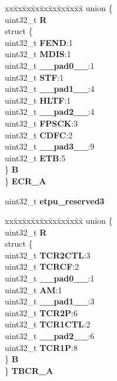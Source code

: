 \begin{DoxyCompactItemize}
\begin{tabbing}
\end{tabbing}\item 
\mbox{\label{structETPU__tag_af8192ba584b02e8444d838ffe1604f05}} 
\begin{tabbing}
xx\=xx\=xx\=xx\=xx\=xx\=xx\=xx\=xx\=\kill
union \{\\
\>uint32\_t {\bfseries R}\\
\>struct \{\\
\>\>uint32\_t {\bfseries FEND}:1\\
\>\>uint32\_t {\bfseries MDIS}:1\\
\>\>uint32\_t {\bfseries \_\_pad0\_\_}:1\\
\>\>uint32\_t {\bfseries STF}:1\\
\>\>uint32\_t {\bfseries \_\_pad1\_\_}:4\\
\>\>uint32\_t {\bfseries HLTF}:1\\
\>\>uint32\_t {\bfseries \_\_pad2\_\_}:4\\
\>\>uint32\_t {\bfseries FPSCK}:3\\
\>\>uint32\_t {\bfseries CDFC}:2\\
\>\>uint32\_t {\bfseries \_\_pad3\_\_}:9\\
\>\>uint32\_t {\bfseries ETB}:5\\
\>\} {\bfseries B}\\
\} {\bfseries ECR\_A}\\

\end{tabbing}\item 
\mbox{\label{structETPU__tag_a47f133603a393362d9591ccdd529f525}} 
uint32\+\_\+t {\bfseries etpu\+\_\+reserved3}
\item 
\mbox{\label{structETPU__tag_a1403a3db01b18d3e33389db17277775d}} 
\begin{tabbing}
xx\=xx\=xx\=xx\=xx\=xx\=xx\=xx\=xx\=\kill
union \{\\
\>uint32\_t {\bfseries R}\\
\>struct \{\\
\>\>uint32\_t {\bfseries TCR2CTL}:3\\
\>\>uint32\_t {\bfseries TCRCF}:2\\
\>\>uint32\_t {\bfseries \_\_pad0\_\_}:1\\
\>\>uint32\_t {\bfseries AM}:1\\
\>\>uint32\_t {\bfseries \_\_pad1\_\_}:3\\
\>\>uint32\_t {\bfseries TCR2P}:6\\
\>\>uint32\_t {\bfseries TCR1CTL}:2\\
\>\>uint32\_t {\bfseries \_\_pad2\_\_}:6\\
\>\>uint32\_t {\bfseries TCR1P}:8\\
\>\} {\bfseries B}\\
\} {\bfseries TBCR\_A}\\


\end{tabbing}
\end{DoxyCompactItemize}
